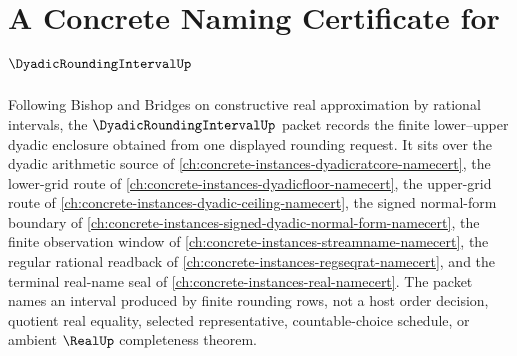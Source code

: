 \chapter{A Concrete Naming Certificate for $\DyadicRoundingIntervalUp$}
\label{ch:concrete-instances-dyadic-rounding-interval-namecert}

Following Bishop and Bridges on constructive real approximation by rational intervals, the $\DyadicRoundingIntervalUp$ packet records the finite lower--upper dyadic enclosure obtained from one displayed rounding request. It sits over the dyadic arithmetic source of \autoref{ch:concrete-instances-dyadicratcore-namecert}, the lower-grid route of \autoref{ch:concrete-instances-dyadicfloor-namecert}, the upper-grid route of \autoref{ch:concrete-instances-dyadic-ceiling-namecert}, the signed normal-form boundary of \autoref{ch:concrete-instances-signed-dyadic-normal-form-namecert}, the finite observation window of \autoref{ch:concrete-instances-streamname-namecert}, the regular rational readback of \autoref{ch:concrete-instances-regseqrat-namecert}, and the terminal real-name seal of \autoref{ch:concrete-instances-real-namecert}. The packet names an interval produced by finite rounding rows, not a host order decision, quotient real equality, selected representative, countable-choice schedule, or ambient $\RealUp$ completeness theorem.

